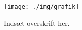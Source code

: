 \begin{figure}[htbp]
  \centering
  \texttt{[image: ./img/grafik]}
  \caption{Indsæt overskrift her.}
  \label{fig:label-her}
\end{figure}